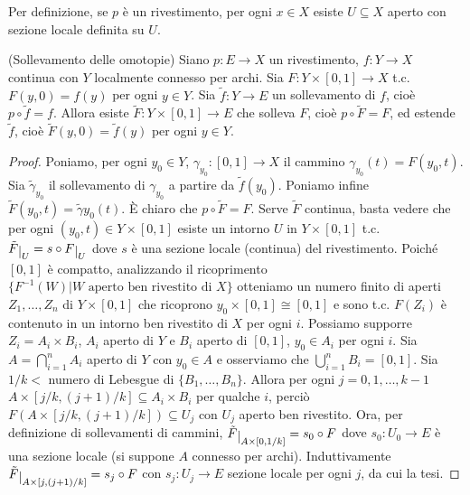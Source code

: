 \begin{oss}
  Per definizione, se $p$ è un rivestimento, per ogni $x \in X$ esiste $U \subseteq X$ aperto con sezione locale definita su $U$.
\end{oss}

\begin{thm} \label{soll_omo}
  (Sollevamento delle omotopie) Siano $p:E \longrightarrow X$ un rivestimento, $f:Y \longrightarrow X$ continua con $Y$ localmente connesso per archi. Sia $F:Y \times[0, 1] \longrightarrow X$ t.c. $F(y, 0)=f(y)$ per ogni $y \in Y$. Sia $\tilde{f}:Y \longrightarrow E$ un sollevamento di $f$, cioè $p \circ \tilde{f}=f$.
  Allora esiste $\tilde{F}:Y \times [0, 1] \longrightarrow E$ che solleva $F$, cioè $p \circ \tilde{F}=F$, ed estende $\tilde{f}$, cioè $\tilde{F}(y, 0)=\tilde{f}(y)$ per ogni $y \in Y$.
\end{thm}

\begin{proof}
  Poniamo, per ogni $y_0 \in Y$, $\gamma_{y_0}:[0, 1] \longrightarrow X$ il cammino $\gamma_{y_0}(t)=F(y_0, t)$. Sia $\tilde{\gamma}_{y_0}$ il sollevamento di $\gamma_{y_0}$ a partire da $\tilde{f}(y_0)$. Poniamo infine $\tilde{F}(y_0, t)=\tilde{\gamma}{y_0}(t)$.
  È chiaro che $p \circ \tilde{F}=F$. Serve $\tilde{F}$ continua, basta vedere che per ogni $(y_0, t) \in Y \times [0, 1]$ esiste un intorno $U$ in $Y \times [0, 1]$ t.c. $\tilde{F}\restrict{U}=s \circ F\restrict{U}$ dove $s$ è una sezione locale (continua) del rivestimento.
  Poiché $[0, 1]$ è compatto, analizzando il ricoprimento $\{F^{-1}(W) | W \text{ aperto ben rivestito di } X\}$ otteniamo un numero finito di aperti $Z_1, \dots, Z_n$ di $Y \times [0, 1]$ che ricoprono $y_0 \times [0, 1] \cong [0, 1]$ e sono t.c. $F(Z_i)$ è contenuto in un intorno ben rivestito di $X$ per ogni $i$.
  Possiamo supporre $Z_i=A_i \times B_i$, $A_i$ aperto di $Y$ e $B_i$ aperto di $[0, 1]$, $y_0 \in A_i$ per ogni $i$. Sia $A= \bigcap_{i=1}^n A_i$ aperto di $Y$ con $y_0 \in A$ e osserviamo che $\bigcup_{i=1}^n B_i=[0, 1]$.
  Sia $1/k<$ numero di Lebesgue di $\{B_1, \dots, B_n\}$. Allora per ogni $j=0, 1, \dots, k-1$ $A \times [j/k, (j+1)/k] \subseteq A_i \times B_i$ per qualche $i$, perciò $F(A \times [j/k, (j+1)/k]) \subseteq U_j$ con $U_j$ aperto ben rivestito.
  Ora, per definizione di sollevamenti di cammini, $\tilde{F} \restrict{A \times [0, 1/k]}=s_0 \circ F$ dove $s_0: U_0 \longrightarrow E$ è una sezione locale (si suppone $A$ connesso per archi). Induttivamente $\tilde{F} \restrict{A \times [j, (j+1)/k]}=s_j \circ F$ con $s_j: U_j \longrightarrow E$ sezione locale per ogni $j$, da cui la tesi.
\end{proof}

